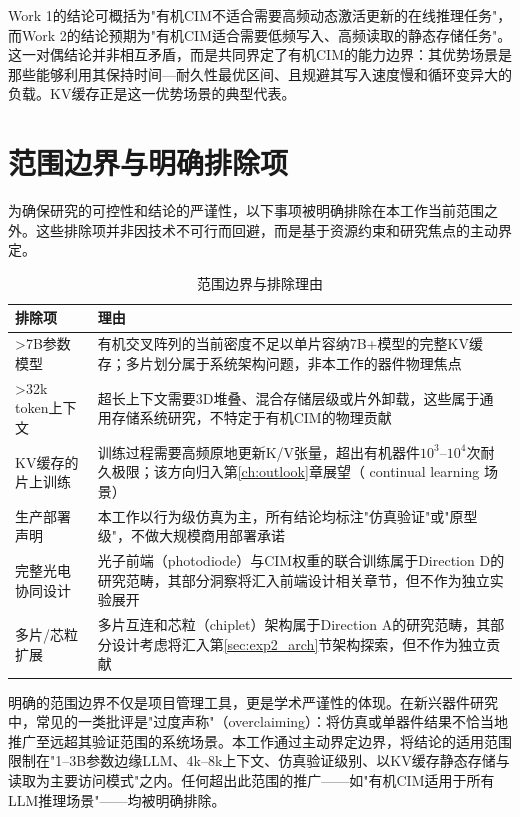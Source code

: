 Work 1的结论可概括为"有机CIM不适合需要高频动态激活更新的在线推理任务"，而Work 2的结论预期为"有机CIM适合需要低频写入、高频读取的静态存储任务"。这一对偶结论并非相互矛盾，而是共同界定了有机CIM的能力边界：其优势场景是那些能够利用其保持时间—耐久性最优区间、且规避其写入速度慢和循环变异大的负载。KV缓存正是这一优势场景的典型代表。


\section{范围边界与明确排除项}
\label{sec:work2_boundaries}

为确保研究的可控性和结论的严谨性，以下事项被明确排除在本工作当前范围之外。这些排除项并非因技术不可行而回避，而是基于资源约束和研究焦点的主动界定。

\begin{table}[htbp]
\centering
\caption{范围边界与排除理由}
\label{tab:boundaries}
\begin{tabular}{lp{8cm}}
\toprule
排除项 & 理由 \\
\midrule
>7B参数模型 & 有机交叉阵列的当前密度不足以单片容纳7B+模型的完整KV缓存；多片划分属于系统架构问题，非本工作的器件物理焦点 \\
>32k token上下文 & 超长上下文需要3D堆叠、混合存储层级或片外卸载，这些属于通用存储系统研究，不特定于有机CIM的物理贡献 \\
KV缓存的片上训练 & 训练过程需要高频原地更新K/V张量，超出有机器件$10^3$–$10^4$次耐久极限；该方向归入第\ref{ch:outlook}章展望（ continual learning 场景） \\
生产部署声明 & 本工作以行为级仿真为主，所有结论均标注"仿真验证"或"原型级"，不做大规模商用部署承诺 \\
完整光电协同设计 & 光子前端（photodiode）与CIM权重的联合训练属于Direction D的研究范畴，其部分洞察将汇入前端设计相关章节，但不作为独立实验展开 \\
多片/芯粒扩展 & 多片互连和芯粒（chiplet）架构属于Direction A的研究范畴，其部分设计考虑将汇入第\ref{sec:exp2_arch}节架构探索，但不作为独立贡献 \\
\bottomrule
\end{tabular}
\end{table}

明确的范围边界不仅是项目管理工具，更是学术严谨性的体现。在新兴器件研究中，常见的一类批评是"过度声称"（overclaiming）：将仿真或单器件结果不恰当地推广至远超其验证范围的系统场景。本工作通过主动界定边界，将结论的适用范围限制在"1–3B参数边缘LLM、4k–8k上下文、仿真验证级别、以KV缓存静态存储与读取为主要访问模式"之内。任何超出此范围的推广——如"有机CIM适用于所有LLM推理场景"——均被明确排除。

